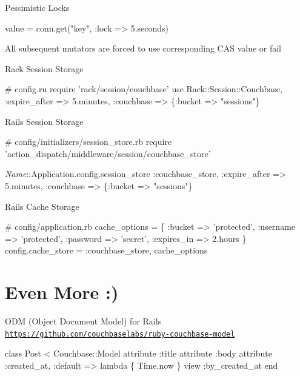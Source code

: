 \documentclass[aspectratio=43,handout]{beamer}
\begin{document}
\begin{frame}[fragile]{Pessimistic Locks}
  \begin{semiverbatim}
    value = conn.get("key", \alert{:lock => 5.seconds})
  \end{semiverbatim}

  All subsequent mutators are forced to use corresponding CAS value or fail
\end{frame}

\begin{frame}[fragile]{Rack Session Storage}
  \begin{semiverbatim}
    # config.ru
    require 'rack/session/couchbase'
    use Rack::Session::Couchbase,
        :expire_after => 5.minutes,
        :couchbase => \{:bucket => "sessions"\}
  \end{semiverbatim}
\end{frame}

\begin{frame}[fragile]{Rails Session Storage}
  \begin{semiverbatim}
    # config/initializers/session\_store.rb
    require \\
      'action_dispatch/middleware/session/couchbase_store'

    {\itshape{}Name}::Application.config.session_store :couchbase_store,
                      :expire_after => 5.minutes,
                      :couchbase => \{:bucket => "sessions"\}
  \end{semiverbatim}
\end{frame}

\begin{frame}[fragile]{Rails Cache Storage}
  \begin{semiverbatim}
    # config/application.rb
    cache_options = \{
      :bucket => 'protected',
      :username => 'protected',
      :password => 'secret',
      :expires_in => 2.hours
    \}
    config.cache_store = :couchbase_store, cache_options
  \end{semiverbatim}
\end{frame}

\section{Even More :)}

\begin{frame}[fragile]{ODM (Object Document Model) for Rails}
  \href{https://github.com/couchbaselabs/ruby-couchbase-model}{\tt{}https://github.com/couchbaselabs/ruby-couchbase-model}


  \begin{semiverbatim}
    class Post < Couchbase::Model
      attribute :title
      attribute :body
      attribute :created\_at, :default => lambda \{ Time.now \}
      view :by\_created\_at
    end
  \end{semiverbatim}
\end{frame}
\end{document}
